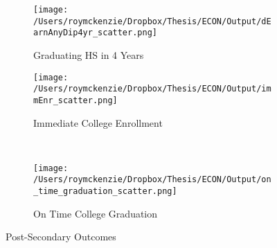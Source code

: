 \documentclass[../thesis_main.tex]{subfiles}
\begin{document}
\begin{figure}
     \centering
     \begin{subfigure}[b]{0.4\textwidth}
         \centering
         \texttt{[image: /Users/roymckenzie/Dropbox/Thesis/ECON/Output/dEarnAnyDip4yr\_scatter.png]}
         \caption{Graduating HS in 4 Years}
         \label{fig:dEarnAnyDip4yr}
     \end{subfigure}
     \hfill
     \begin{subfigure}[b]{0.4\textwidth}
         \centering
         \texttt{[image: /Users/roymckenzie/Dropbox/Thesis/ECON/Output/immEnr\_scatter.png]}
         \caption{Immediate College Enrollment}
         \label{fig:immEnr}
     \end{subfigure}\\

     \begin{subfigure}[b]{0.4\textwidth}
         \centering
         \texttt{[image: /Users/roymckenzie/Dropbox/Thesis/ECON/Output/on\_time\_graduation\_scatter.png]}
         \caption{On Time College Graduation}
         \label{fig:on_time_graduation}
     \end{subfigure}
    \caption{Post-Secondary Outcomes}
    \label{fig:long}
\end{figure}
\end{document}

